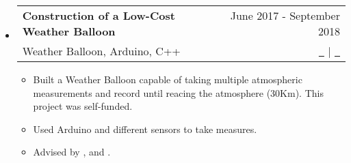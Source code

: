 \documentclass[a4paper,11pt]{article}
\makeatletter
\newcommand{\resumeQuadHeading}[4]{
	\item
	\begin{tabular*}{0.96\textwidth}[t]{l@{\extracolsep{\fill}}r}
		\textbf{#1} & \small #2 \\
		\small#3 & \small #4 \\
	\end{tabular*}
}
\newcommand{\resumeHeadingListStart}{
	\begin{itemize}[leftmargin=0.15in, label={}]
	}
\newcommand{\resumeHeadingListEnd}{\end{itemize}}
\makeatother
\begin{document}
	\resumeHeadingListStart{}
	\resumeQuadHeading{Construction of a Low-Cost Weather Balloon}{June 2017 - September 2018}{Weather Balloon, Arduino, C++}{\href{https://guillemtutusausalcaraz.weebly.com/weatherballoon.html}{\faFileTextO \ \graydotuline{Report}} $ | $ \href{https://github.com/Tutusaus/Weather-Balloon}{\faGithub \ \graydotuline{Code}}}
	\begin{itemize}[leftmargin=3em, itemsep=0.1em, topsep=2pt]
		\item \small Built a Weather Balloon capable of taking multiple atmospheric measurements and record until reacing the atmosphere (30Km). This project was self-funded.
		\item \small Used Arduino and different sensors to take measures.
		\item \small Advised by \href{https://www.linkedin.com/in/ingrid-mu%C3%B1oz-fern%C3%A1ndez-07796920/?originalSubdomain=es}{\graydotuline{Íngrid Muñoz}}, \href{https://www.linkedin.com/in/joshua-tristancho-%E5%90%89-b2444517/}{\graydotuline{Joshua Tristancho}} and  \href{https://www.linkedin.com/in/n%C3%BAria-sal%C3%A1n-1820b71b/}{\graydotuline{Núria Salán}}.
	\end{itemize}
	\resumeHeadingListEnd{}
	
	
	
	
	
	
	
	
\end{document}
